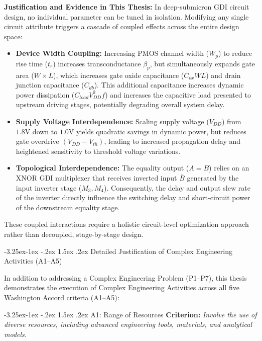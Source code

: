 \documentclass[12pt,a4paper,oneside]{report}
\makeatletter
\renewcommand\subsection{\@startsection{subsection}{2}{\z@}%
                                     {-3.25ex\@plus -1ex \@minus -.2ex}%
                                     {1.5ex \@plus .2ex}%
                                     {\normalfont\normalsize\bfseries\itshape}}
\renewcommand\subsubsection{\@startsection{subsubsection}{3}{\z@}%
                                     {-3.25ex\@plus -1ex \@minus -.2ex}%
                                     {1.5ex \@plus .2ex}%
                                     {\normalfont\normalsize\itshape}}
\makeatother
\begin{document}
\noindent\textbf{Justification and Evidence in This Thesis:}
In deep-submicron GDI circuit design, no individual parameter can be tuned in isolation. Modifying any single circuit attribute triggers a cascade of coupled effects across the entire design space:
\begin{itemize}
\item \textbf{Device Width Coupling:} Increasing PMOS channel width ($W_p$) to reduce rise time ($t_r$) increases transconductance $\beta_p$, but simultaneously expands gate area ($W \times L$), which increases gate oxide capacitance ($C_{ox} W L$) and drain junction capacitance ($C_{db}$). This additional capacitance increases dynamic power dissipation ($C_{load} V_{DD}^2 f$) and increases the capacitive load presented to upstream driving stages, potentially degrading overall system delay.
\item \textbf{Supply Voltage Interdependence:} Scaling supply voltage ($V_{DD}$) from $1.8\text{V}$ down to $1.0\text{V}$ yields quadratic savings in dynamic power, but reduces gate overdrive $(V_{DD} - V_{th})$, leading to increased propagation delay and heightened sensitivity to threshold voltage variations.
\item \textbf{Topological Interdependence:} The equality output ($A=B$) relies on an XNOR GDI multiplexer that receives inverted input $\overline{B}$ generated by the input inverter stage ($M_3, M_4$). Consequently, the delay and output slew rate of the inverter directly influence the switching delay and short-circuit power of the downstream equality stage.
\end{itemize}
These coupled interactions require a holistic circuit-level optimization approach rather than decoupled, stage-by-stage design.

\subsection{Detailed Justification of Complex Engineering Activities (A1--A5)}

In addition to addressing a Complex Engineering Problem (P1--P7), this thesis demonstrates the execution of Complex Engineering Activities across all five Washington Accord criteria (A1--A5):

\subsubsection{A1: Range of Resources}
\textbf{Criterion:} \textit{Involve the use of diverse resources, including advanced engineering tools, materials, and analytical models.}
\end{document}
